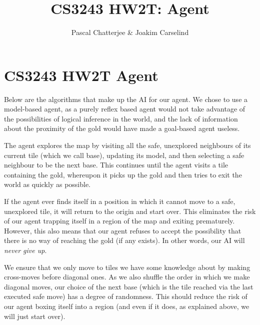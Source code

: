 \documentclass[11pt,a4paper]{article}
\author{Pascal Chatterjee & Joakim Carselind}
\title{CS3243 HW2T: Agent}
\begin{document}
 

\section*{CS3243 HW2T Agent}

Below are the algorithms that make up the AI for our agent. We chose to use a model-based agent, as a purely reflex based agent would not take advantage of the possibilities of logical inference in the world, and the lack of information about the proximity of the gold would have made a goal-based agent useless.

The agent explores the map by visiting all the safe, unexplored neighbours of its current tile (which we call base), updating its model, and then selecting a safe neighbour to be the next base. This continues until the agent visits a tile containing the gold, whereupon it picks up the gold and then tries to exit the world as quickly as possible.  

If the agent ever finds itself in a position in which it cannot move to a safe, unexplored tile, it will return to the origin and start over. This eliminates the risk of our agent trapping itself in a region of the map and exiting prematurely. However, this also means that our agent refuses to accept the possibility that there is no way of reaching the gold (if any exists). In other words, our AI will \textit{never give up}.  

We ensure that we only move to tiles we have some knowledge about by making cross-moves before diagonal ones. As we also shuffle the order in which we make diagonal moves, our choice of the next base (which is the tile reached via the last executed safe move) has a degree of randomness. This should reduce the risk of our agent boxing itself into a region (and even if it does, as explained above, we will just start over).  

\listofalgorithms 
\end{document}
